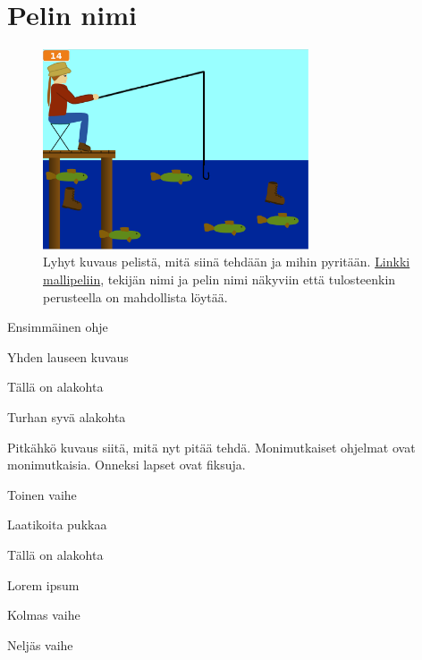 \documentclass[12pt,twoside]{article}
\newenvironment{vaihetaso1}{%
    \LARGE
    \itemize
}{%
    \enditemize
}
\newenvironment{vaihetaso2}{%
    \Large
    \itemize
}{%
    \enditemize
}
\newenvironment{vaihetaso3}{%
    \large
    \itemize
}{%
    \enditemize
}
\begin{document}
\selectfont
\section*{Pelin nimi}

\begin{figure}
  \centering
  \captionsetup{labelformat=empty}
  \caption{Lyhyt kuvaus pelistä, mitä siinä tehdään ja mihin pyritään. \href{https://google.fi}{Linkki mallipeliin}, tekijän nimi ja pelin nimi näkyviin että tulosteenkin perusteella on mahdollista löytää.}
  \includegraphics[width=0.7\textwidth]{kuvat/esimerkki.png}
\end{figure}

\begin{vaihetaso1}
	\item Ensimmäinen ohje
	\begin{vaihetaso2}
		\item Yhden lauseen kuvaus
		\item Tällä on alakohta
		\begin{vaihetaso3}
			\item Turhan syvä alakohta
		\end{vaihetaso3}
		\item Pitkähkö kuvaus siitä, mitä nyt pitää tehdä. Monimutkaiset ohjelmat ovat monimutkaisia. Onneksi lapset ovat fiksuja.
	\end{vaihetaso2}
	\item Toinen vaihe
	\begin{vaihetaso2}
		\item Laatikoita pukkaa
		\item Tällä on alakohta
		\item Lorem ipsum
	\end{vaihetaso2}
	\item Kolmas vaihe
	\item Neljäs vaihe
\end{vaihetaso1}
\end{document}
